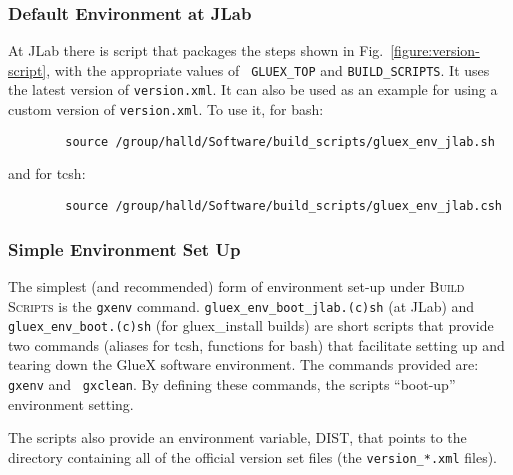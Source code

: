 \documentclass[12pt]{article}
\newcommand{\bs}{\textsc{Build Scripts}}
\newcommand{\gxenv}{{\tt gxenv}}
\begin{document}
\subsubsection{Default Environment at JLab}

At JLab there is script that packages the steps shown in
Fig.~\ref{figure:version-script}, with the appropriate values of {\tt
  GLUEX\_TOP} and {\tt BUILD\_SCRIPTS}. It uses the latest version of
{\tt version.xml}. It can also be used as an example for using a
custom version of {\tt version.xml}. To use it, for bash:
\begin{verbatim}
        source /group/halld/Software/build_scripts/gluex_env_jlab.sh
\end{verbatim}
and for tcsh:
\begin{verbatim}
        source /group/halld/Software/build_scripts/gluex_env_jlab.csh
\end{verbatim}

\subsubsection{Simple Environment Set Up}

The simplest (and recommended) form of environment set-up under \bs{}
is the \gxenv{} command.  {\tt gluex\_env\_boot\_jlab.(c)sh} (at JLab)
and {\tt gluex\_env\_boot.(c)sh} (for gluex\_install builds) are short
scripts that provide two commands (aliases for tcsh, functions for
bash) that facilitate setting up and tearing down the GlueX software
environment. The commands provided are: {\tt gxenv} and {\tt
  gxclean}. By defining these commands, the scripts ``boot-up''
environment setting.

The scripts also provide an environment variable, DIST, that points to
the directory containing all of the official version set files (the
{\tt version\_*.xml} files).
\end{document}
